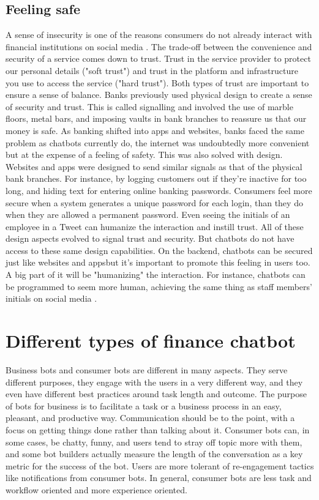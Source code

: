 \subsection{Feeling safe}
A sense of insecurity is one of the reasons consumers do not already interact with financial institutions on social media \cite{letheren2017}. The trade-off between the convenience and security of a service comes down to trust. Trust in the service provider to protect our personal details ("soft trust") and trust in the platform and infrastructure you use to access the service ("hard trust"). Both types of trust are important to ensure a sense of balance. Banks previously used physical design to create a sense of security and trust. This is called signalling and involved the use of marble floors, metal bars, and imposing vaults in bank branches to reassure us that our money is safe. As banking shifted into apps and websites, banks faced the same problem as chatbots currently do, the internet was undoubtedly more convenient but at the expense of a feeling of safety. This was also solved with design. Websites and apps were designed to send similar signals as that of the physical bank branches. For instance, by logging customers out if they're inactive for too long, and hiding text for entering online banking passwords. Consumers feel more secure when a system generates a unique password for each login, than they do when they are allowed a permanent password. Even seeing the initials of an employee in a Tweet can humanize the interaction and instill trust. All of these design aspects evolved to signal trust and security. But chatbots do not have access to these same design capabilities. On the backend, chatbots can be secured just like websites and appsbut it's important to promote this feeling in users too. A big part of it will be "humanizing" the interaction. For instance, chatbots can be programmed to seem more human, achieving the same thing as staff members' initials on social media \cite{letheren2017}.


\section{Different types of finance chatbot}
Business bots and consumer bots are different in many aspects. They serve different purposes, they engage with the users in a very different way, and they even have different best practices around task length and outcome.
The purpose of bots for business is to facilitate a task or a business process in an easy, pleasant, and productive way. Communication should be to the point, with a focus on getting things done rather than talking about it. Consumer bots can, in some cases, be chatty, funny, and users tend to stray off topic more with them, and some bot builders actually measure the length of the conversation as a key metric for the success of the bot. Users are more tolerant of re-engagement tactics like notifications from consumer bots. In general, consumer bots are less task and workflow oriented and more experience oriented. \cite{shevat2017}


